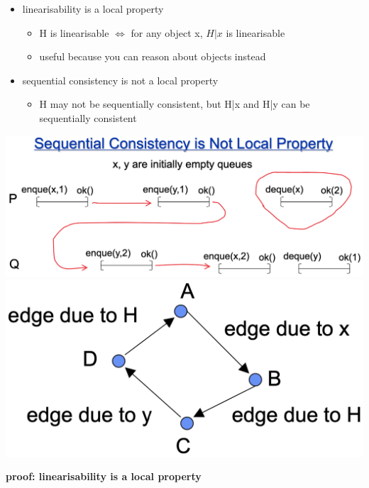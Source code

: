 \documentclass[10pt, landscape]{article}
\begin{document}
\begin{multicols*}{3}
  \begin{itemize}
    \item linearisability is a local property
      \begin{itemize}
        \item H is linearisable $\iff$ for any object x, $H \vert x$ is linearisable
        \item useful because you can reason about objects instead
      \end{itemize}
    \item sequential consistency is not a local property
      \begin{itemize}
        \item H may not be sequentially consistent, but H|x and H|y can be sequentially consistent
      \end{itemize}
  \end{itemize}
  \includegraphics[width=0.65\linewidth]{cs4231-sequential-consistency-not-local.png} 
  \includegraphics[width=0.3\linewidth]{cs4231-linearisability-local-property-proof.png} 

  \textbf{proof: linearisability is a local property}


\end{multicols*}
\end{document}
